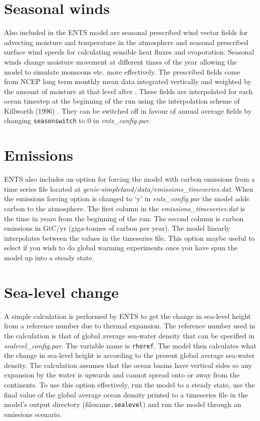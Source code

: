 \documentclass[10pt,a4paper]{report}
\begin{document}
\section{Seasonal winds}

Also included in the ENTS model are seasonal prescribed wind vector
fields for advecting moisture and temperature in the atmosphere and
seasonal prescribed surface wind speeds for calculating sensible
heat fluxes and evaporation. Seasonal winds change moisture movement
at different times of the year allowing the model to simulate
monsoons etc. more effectively. The prescribed fields come from NCEP
long term monthly mean data integrated vertically and weighted by
the amount of moisture at that level after \cite{Uvic}. These fields
are interpolated for each ocean timestep at the beginning of the run
using the interpolation scheme of Killworth (1996) \cite{Killworth}.
They can be switched off in favour of annual average fields by
changing {\tt seasonswitch} to 0 in {\em ents\_config.par}.

\section{Emissions}

ENTS also includes an option for forcing the model with carbon
emissions from a time series file located at {\em
genie-simpleland/data/emissions\_timeseries.dat}. When the emissions
forcing option is changed to `y' in {\em ents\_config.par} the model
adds carbon to the atmosphere. The first column in the {\em
emissions\_timeseries.dat} is the time in years from the beginning
of the run. The second column is carbon emissions in GtC/yr
(giga-tonnes of carbon per year). The model linearly interpolates
between the values in the timeseries file. This option maybe useful
to select if you wish to do global warming experiments once you have
spun the model up into a steady state.

\section{Sea-level change}

A simple calculation is performed by ENTS to get the change in
sea-level height from a reference number due to thermal expansion.
The reference number used in the calculation is that of global
average sea-water density that can be specified in {\em
sealevel\_config.par}. The variable name is {\tt rhoref}. The model
then calculates what the change in sea-level height is according to
the present global average sea-water density. The calculation
assumes that the ocean basins have vertical sides so any expansion
by the water is upwards and cannot spread onto or away from the
continents. To use this option effectively, run the model to a
steady state, use the final value of the global average ocean
density printed to a timeseries file in the model's output directory
(filename{\tt.sealevel}) and run the model through an emissions
scenario.
\end{document}
